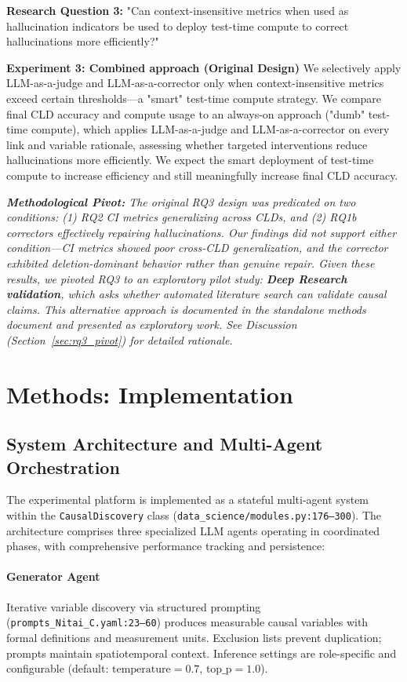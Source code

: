 \textbf{Research Question 3:} "Can context-insensitive metrics when used as hallucination indicators be used to deploy test-time compute to correct hallucinations more efficiently?"

\textbf{Experiment 3: Combined approach (Original Design)}
We selectively apply LLM-as-a-judge and LLM-as-a-corrector only when context-insensitive metrics exceed certain thresholds—a "smart" test-time compute strategy. We compare final CLD accuracy and compute usage to an always-on approach ("dumb" test-time compute), which applies LLM-as-a-judge and LLM-as-a-corrector on every link and variable rationale, assessing whether targeted interventions reduce hallucinations more efficiently. We expect the smart deployment of test-time compute to increase efficiency and still meaningfully increase final CLD accuracy.

\textit{\textbf{Methodological Pivot:} The original RQ3 design was predicated on two conditions: (1) RQ2 CI metrics generalizing across CLDs, and (2) RQ1b correctors effectively repairing hallucinations. Our findings did not support either condition—CI metrics showed poor cross-CLD generalization, and the corrector exhibited deletion-dominant behavior rather than genuine repair. Given these results, we pivoted RQ3 to an exploratory pilot study: \textbf{Deep Research validation}, which asks whether automated literature search can validate causal claims. This alternative approach is documented in the standalone methods document and presented as exploratory work. See Discussion (Section~\ref{sec:rq3_pivot}) for detailed rationale.}


\section{Methods: Implementation}\label{sec:methods}

\subsection{System Architecture and Multi-Agent Orchestration}

The experimental platform is implemented as a stateful multi-agent system within the \texttt{CausalDiscovery} class (\texttt{data\_science/modules.py:176--300}). The architecture comprises three specialized LLM agents operating in coordinated phases, with comprehensive performance tracking and persistence:

\paragraph{Generator Agent}
Iterative variable discovery via structured prompting (\texttt{prompts\_Nitai\_C.yaml:23--60}) produces measurable causal variables with formal definitions and measurement units. Exclusion lists prevent duplication; prompts maintain spatiotemporal context. Inference settings are role-specific and configurable (default: \(\text{temperature}=0.7\), \(\text{top\_p}=1.0\)).

